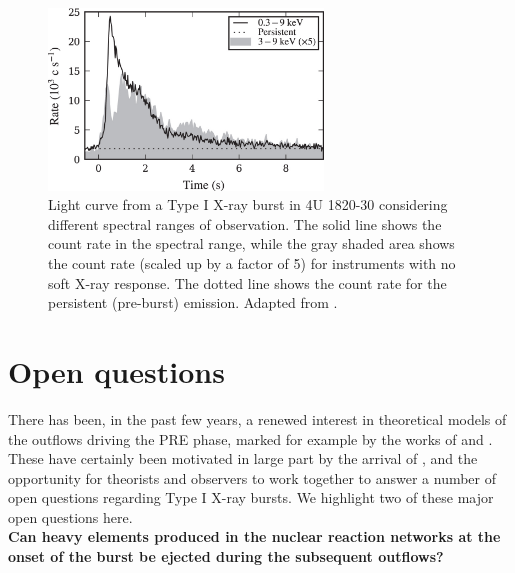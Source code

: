 \documentclass[../main.tex]{subfiles}
\begin{document}
\begin{figure}[htb!]
    \centering
    \includegraphics[width=0.65\textwidth]{figures/Keek2018_fig1_mod.jpg}
    \caption[\Nicer~ PRE burst light curve]{Light curve from a Type I X-ray burst in 4U 1820-30 considering different spectral ranges of observation. The solid line shows the count rate in the {\Nicer} spectral range, while the gray shaded area shows the count rate (scaled up by a factor of 5) for instruments with no soft X-ray response. The dotted line shows the count rate for the persistent (pre-burst) emission. Adapted from \citet{Keek2018a}.}
    \label{fig:keek2018_fig1}
\end{figure}

\section{Open questions}\label{sec:open_questions}
There has been, in the past few years, a renewed interest in theoretical models of the outflows driving the PRE phase, marked for example by the works of \citet{YuHangWeinberg2018} and \citet{Herrera2020}. These have certainly been motivated in large part by the arrival of \Nicer, and the opportunity for theorists and observers to work together to answer a number of open questions regarding Type I X-ray bursts. We highlight two of these major open questions here. \\

\noindent\textbf{Can heavy elements produced in the nuclear reaction networks at the onset of the burst be ejected during the subsequent outflows?} 

\end{document}
